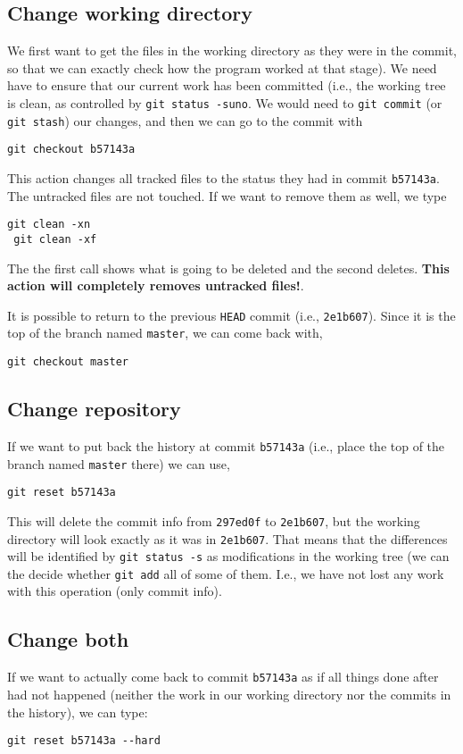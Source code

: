 \documentclass[a4paper,10pt]{article}
\begin{document}
\subsection*{Change working directory}
We first want to get the files in the working directory as they were in the commit, so that we can exactly check how the program worked at that stage). We need have to ensure that our current work has been committed (i.e., the working tree is clean, as controlled by \texttt{git status -suno}. We would need to \texttt{git commit} (or \texttt{git stash}) our changes, and then we can go to the commit with 
\begin{lstlisting}[style=Alice]
 git checkout b57143a
\end{lstlisting}
This action changes all tracked files to the status they had in commit \texttt{b57143a}. The untracked files are not touched. If we want to remove them as well, we type

\begin{lstlisting}[style=Alice]
 git clean -xn
 git clean -xf
\end{lstlisting}
The the first call shows what is going to be deleted and the second deletes. \textbf{This action will completely removes untracked files!}.

It is possible to return to the previous \texttt{HEAD} commit (i.e., \texttt{2e1b607}). Since it is the top of the branch named \texttt{master}, we can come back with,
\begin{lstlisting}[style=Alice]
 git checkout master
\end{lstlisting}

\subsection*{Change repository}
If we want to put back the history at commit \texttt{b57143a} (i.e., place the top of the branch named \texttt{master} there) we can use,
\begin{lstlisting}[style=Alice]
 git reset b57143a
\end{lstlisting}
This will delete the commit info from \texttt{297ed0f} to \texttt{2e1b607}, but the working directory will look exactly as it was in \texttt{2e1b607}. That means that the differences will be identified by \texttt{git status -s} as modifications in the working tree (we can the decide whether \texttt{git add} all of some of them. I.e., we have not lost any work with this operation (only commit info).

\subsection*{Change both}
If we want to actually come back to commit \texttt{b57143a} as if all things done after had not happened (neither the work in our working directory nor the commits in the history), we can type:
\begin{lstlisting}[style=Alice]
 git reset b57143a --hard
\end{lstlisting}
\end{document}
